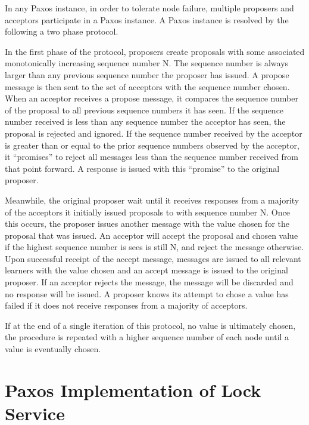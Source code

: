 \documentclass[11pt, onecolumn]{article}
\begin{document}
In any Paxos instance, in order to tolerate node failure, multiple proposers and acceptors participate in a Paxos instance.
A Paxos instance is resolved by the following a two phase protocol.

In the first phase of the protocol, proposers create proposals with some associated monotonically increasing sequence number N. 
The sequence number is always larger than any previous sequence number the proposer has issued. 
A propose message is then sent to the set of acceptors with the sequence number chosen. 
When an acceptor receives a propose message, it compares the sequence number of the proposal to all previous sequence numbers it has seen.
If the sequence number received is less than any sequence number the acceptor has seen, the proposal is rejected and ignored.
If the sequence number received by the acceptor is greater than or equal to the prior sequence numbers observed by the acceptor, it ``promises'' to reject all messages less than the sequence number received from that point forward.
A response is issued with this ``promise'' to the original proposer.

Meanwhile, the original proposer wait until it receives responses from a majority of the acceptors it initially issued proposals to with sequence number N.
Once this occurs, the proposer issues another message with the value chosen for the proposal that was issued.
An acceptor will accept the proposal and chosen value if the highest sequence number is sees is still N, and reject the message otherwise.
Upon successful receipt of the accept message, messages are issued to all relevant learners with the value chosen and an accept message is issued to the original proposer.
If an acceptor rejects the message, the message will be discarded and no response will be issued.
A proposer knows its attempt to chose a value has failed if it does not receive responses from a majority of acceptors.

If at the end of a single iteration of this protocol, no value is ultimately chosen, the procedure is repeated with a higher sequence number of each node until a value is eventually chosen.


\section{Paxos Implementation of Lock Service}
\end{document}

